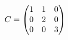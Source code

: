 \documentclass[preview]{standalone}
\begin{document}
\begin{align*}
\special{dvisvgm:raw <g id='unique000'>}C=\begin{pmatrix}1&1&0\\0&2&0\\0&0&3\end{pmatrix}\special{dvisvgm:raw </g>}
\end{align*}
\end{document}
